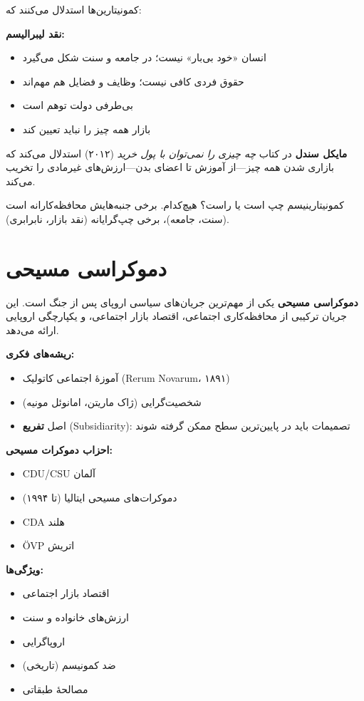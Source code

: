 کمونیتارین‌ها استدلال می‌کنند که:

\textbf{نقد لیبرالیسم:}
\begin{itemize}
    \item انسان «خود بی‌بار» نیست؛ در جامعه و سنت شکل می‌گیرد
    \item حقوق فردی کافی نیست؛ وظایف و فضایل هم مهم‌اند
    \item بی‌طرفی دولت توهم است
    \item بازار همه چیز را نباید تعیین کند
\end{itemize}

\textbf{مایکل سندل} در کتاب \textit{چه چیزی را نمی‌توان با پول خرید} (۲۰۱۲) استدلال می‌کند که بازاری شدن همه چیز—از آموزش تا اعضای بدن—ارزش‌های غیرمادی را تخریب می‌کند.

کمونیتارینیسم چپ است یا راست؟ هیچ‌کدام. برخی جنبه‌هایش محافظه‌کارانه است (سنت، جامعه)، برخی چپ‌گرایانه (نقد بازار، نابرابری).


\section{دموکراسی مسیحی}


\textbf{دموکراسی مسیحی} یکی از مهم‌ترین جریان‌های سیاسی اروپای پس از جنگ است. این جریان ترکیبی از محافظه‌کاری اجتماعی، اقتصاد بازار اجتماعی، و یکپارچگی اروپایی ارائه می‌دهد.

\textbf{ریشه‌های فکری:}
\begin{itemize}
    \item آموزهٔ اجتماعی کاتولیک (Rerum Novarum، ۱۸۹۱)
    \item شخصیت‌گرایی (ژاک ماریتن، امانوئل مونیه)
    \item اصل \textbf{تفریع} (Subsidiarity): تصمیمات باید در پایین‌ترین سطح ممکن گرفته شوند
\end{itemize}

\textbf{احزاب دموکرات مسیحی:}
\begin{itemize}
    \item CDU/CSU آلمان
    \item دموکرات‌های مسیحی ایتالیا (تا ۱۹۹۴)
    \item CDA هلند
    \item ÖVP اتریش
\end{itemize}

\textbf{ویژگی‌ها:}
\begin{itemize}
    \item اقتصاد بازار اجتماعی
    \item ارزش‌های خانواده و سنت
    \item اروپاگرایی
    \item ضد کمونیسم (تاریخی)
    \item مصالحهٔ طبقاتی
\end{itemize}

